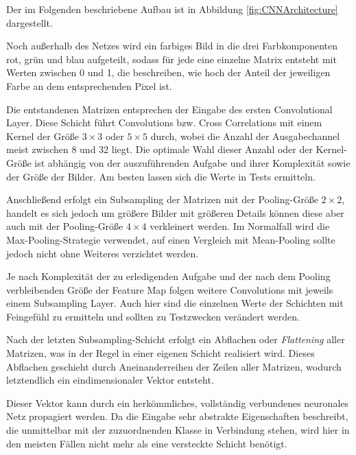 \documentclass[12pt,a4]{article}
\begin{document}
Der im Folgenden beschriebene Aufbau ist in Abbildung \ref{fig:CNNArchitecture} dargestellt.

Noch außerhalb des Netzes wird ein farbiges Bild in die drei Farbkomponenten rot, grün und blau aufgeteilt, sodass für jede eine einzelne Matrix entsteht mit Werten zwischen 0 und 1, die beschreiben, wie hoch der Anteil der jeweiligen Farbe an dem entsprechenden Pixel ist.

Die entstandenen Matrizen entsprechen der Eingabe des ersten Convolutional Layer. Diese Schicht führt Convolutions bzw. Cross Correlations mit einem Kernel der Größe $3 \times 3$ oder $5 \times 5$ durch, wobei die Anzahl der Ausgabechannel meist zwischen 8 und 32 liegt. Die optimale Wahl dieser Anzahl oder der Kernel-Größe ist abhängig von der auszuführenden Aufgabe und ihrer Komplexität sowie der Größe der Bilder. Am besten lassen sich die Werte in Tests ermitteln.

Anschließend erfolgt ein Subsampling der Matrizen mit der Pooling-Größe $2 \times 2$, handelt es sich jedoch um größere Bilder mit größeren Details können diese aber auch mit der Pooling-Größe $4 \times 4$ verkleinert werden. Im Normalfall wird die Max-Pooling-Strategie verwendet, auf einen Vergleich mit Mean-Pooling sollte jedoch nicht ohne Weiteres verzichtet werden.

Je nach Komplexität der zu erledigenden Aufgabe und der nach dem Pooling verbleibenden Größe der Feature Map folgen weitere Convolutions mit jeweils einem Subsampling Layer. Auch hier sind die einzelnen Werte der Schichten mit Feingefühl zu ermitteln und sollten zu Testzwecken verändert werden.

Nach der letzten Subsampling-Schicht erfolgt ein Abflachen oder \textit{Flattening} aller Matrizen, was in der Regel in einer eigenen Schicht realisiert wird. Dieses Abflachen geschieht durch Aneinanderreihen der Zeilen aller Matrizen, wodurch letztendlich ein eindimensionaler Vektor entsteht.

Dieser Vektor kann durch ein herkömmliches, vollständig verbundenes neuronales Netz propagiert werden. Da die Eingabe sehr abstrakte Eigenschaften beschreibt, die unmittelbar mit der zuzuordnenden Klasse in Verbindung stehen, wird hier in den meisten Fällen nicht mehr als eine versteckte Schicht benötigt.
\end{document}
